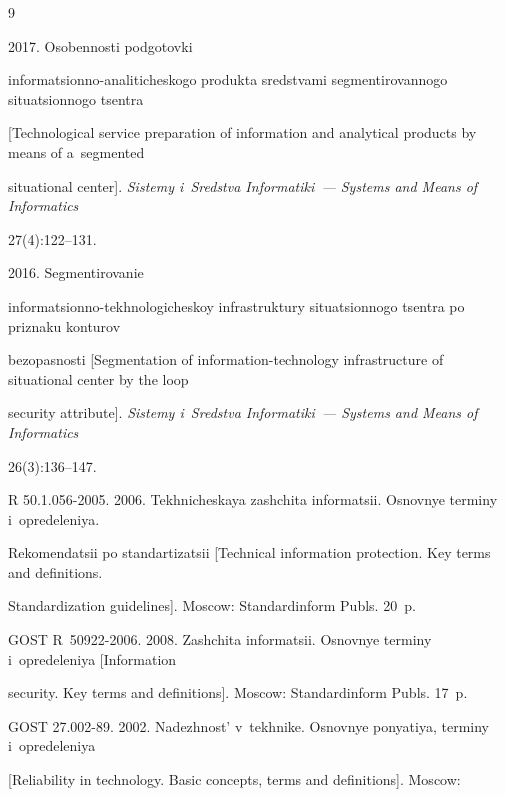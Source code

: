 {\small\frenchspacing

{%


\begin{thebibliography}{9}


 2017. Osobennosti podgotovki  

informatsionno-analiticheskogo produkta sredstvami segmentirovannogo situatsionnogo tsentra 

[Technological service preparation of information and analytical products by means of a~segmented 

situational center]. \textit{Sistemy i~Sredstva Informatiki~--- Systems and Means of Informatics} 

27(4):122--131.


 2016. Segmentirovanie  

informatsionno-tekhnologicheskoy infrastruktury situatsionnogo tsentra po priznaku konturov 

bezopasnosti [Segmentation of information-technology infrastructure of situational center by the loop 

security attribute]. \textit{Sistemy i~Sredstva Informatiki~--- Systems and Means of Informatics} 

26(3):136--147.


R 50.1.056-2005. 2006. Tekhnicheskaya zashchita informatsii. Osnovnye terminy i~opredeleniya. 

Rekomendatsii po standartizatsii [Technical information protection. Key terms and definitions. 

Standardization guidelines]. Moscow: Standardinform Publs. 20~p.


GOST R~50922-2006. 2008. Zashchita informatsii. Osnovnye terminy i~opredeleniya [Information 

security. Key terms and definitions]. Moscow: Standardinform Publs. 17~p.


GOST 27.002-89. 2002. Nadezhnost' v~tekhnike. Osnovnye ponyatiya, terminy i~opredeleniya 

[Reliability in technology. Basic concepts, terms and definitions]. Moscow: 


\end{thebibliography}}}
